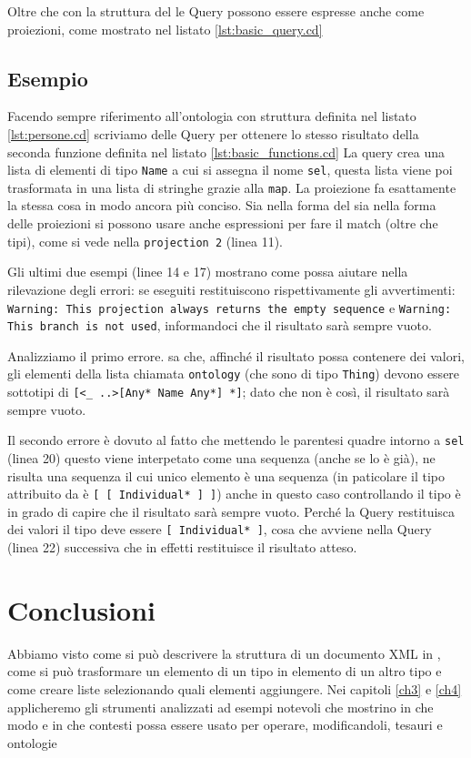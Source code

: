 Oltre che con la struttura del  le Query possono essere espresse anche come proiezioni, come mostrato nel listato \ref{lst:basic_query.cd}

\subsection{Esempio}
Facendo sempre riferimento all'ontologia con struttura definita nel listato \ref{lst:persone.cd} scriviamo delle Query per ottenere lo stesso risultato della seconda funzione definita nel listato \ref{lst:basic_functions.cd}
La query crea una lista di elementi di tipo \verb|Name| a cui si assegna il nome \verb|sel|, questa lista viene poi trasformata in una lista di stringhe grazie alla \verb|map|. La proiezione fa esattamente la stessa cosa in modo ancora più conciso. Sia nella forma del  sia nella forma delle proiezioni si possono usare anche espressioni per fare il match (oltre che tipi), come si vede nella \verb|projection 2| (linea 11).

Gli ultimi due esempi (linee 14 e 17) mostrano come \cduce possa aiutare nella rilevazione degli errori: se eseguiti restituiscono rispettivamente gli avvertimenti: \texttt{Warning: This projection always returns the empty sequence} e \texttt{Warning: This branch is not used}, informandoci che il risultato sarà sempre vuoto.

Analizziamo il primo errore. \cduce sa che, affinché il risultato possa contenere dei valori, gli elementi della lista chiamata \verb|ontology| (che sono di tipo \verb|Thing|) devono essere sottotipi di \verb|[<_ ..>[Any* Name Any*] *]|; dato che non è così, il risultato sarà sempre vuoto.

Il secondo errore è dovuto al fatto che mettendo le parentesi quadre intorno a \verb|sel| (linea 20) questo viene interpetato come una sequenza (anche se lo è già), ne risulta una sequenza il cui unico elemento è una sequenza (in paticolare il tipo attribuito da \cduce è \verb|[ [ Individual* ] ]|) anche in questo caso controllando il tipo \cduce è in grado di capire che il risultato sarà sempre vuoto. Perché la Query restituisca dei valori il tipo deve essere \verb|[ Individual* ]|, cosa che avviene nella Query (linea 22) successiva che in effetti restituisce il risultato atteso.

\section{Conclusioni}
Abbiamo visto come si può descrivere la struttura di un documento XML in \cduce, come si può trasformare un elemento di un tipo in elemento di un altro tipo e come creare liste selezionando quali elementi aggiungere. Nei capitoli \ref{ch3} e \ref{ch4} applicheremo gli strumenti analizzati ad esempi notevoli che mostrino in che modo e in che contesti \cduce possa essere usato per operare, modificandoli, tesauri e ontologie